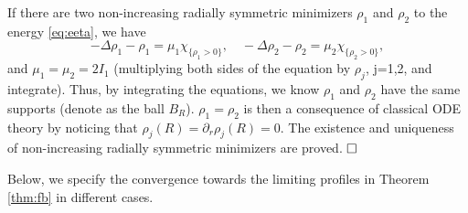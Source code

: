 \documentclass{elsarticle}
\begin{document}
 If there are two non-increasing radially symmetric minimizers $\rho_1$ and $\rho_2$
 to the energy \eqref{eq:eeta}, we have
  \begin{equation*}
 -\Delta \rho_1-\rho_1=\mu_1\chi_{\{\rho_1>0\}},\quad  -\Delta \rho_2-\rho_2=\mu_2\chi_{\{\rho_2>0\}},
 \end{equation*}
 and $\mu_1=\mu_2=2I_1$ (multiplying both sides of the equation by $\rho_j$, j=1,2, and integrate). Thus, by integrating the equations, we know $\rho_1$ and $\rho_2$ have the same supports (denote as the ball $B_R$). $\rho_1=\rho_2$
 is then a consequence of classical ODE theory by noticing that $\rho_j(R)=\partial_r\rho_j(R)=0$. The existence and uniqueness of
 non-increasing radially symmetric minimizers are proved. $\hfill\Box$

   Below, we specify the convergence towards the limiting profiles in Theorem \ref{thm:fb} in different cases.
\end{document}
